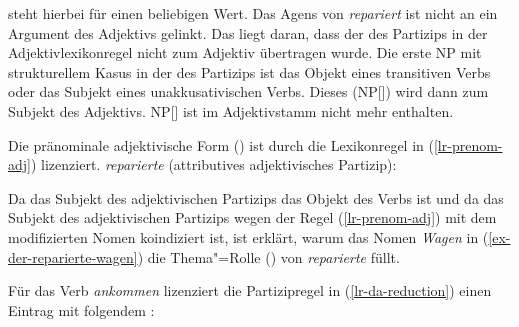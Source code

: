 {\noindent
\etag steht hierbei für einen beliebigen Wert. Das Agens von \emph{repariert} ist nicht an ein
Argument des Adjektivs gelinkt. Das liegt daran, dass der \subjw des Partizips in der
Adjektivlexikonregel nicht zum Adjektiv übertragen wurde. Die erste NP mit strukturellem Kasus in
der \argstl des Partizips ist das Objekt eines transitiven Verbs oder das Subjekt eines
unakkusativischen Verbs. Dieses (NP[\str]) wird dann zum Subjekt des
Adjektivs. NP[\str] ist im Adjektivstamm nicht mehr enthalten.

Die pränominale adjektivische Form () ist durch die Lexikonregel in (\ref{lr-prenom-adj})
lizenziert.
\eas
\emph{reparierte} (attributives adjektivisches Partizip):\\
\zs

\noindent
Da das Subjekt des adjektivischen Partizips das Objekt des Verbs ist und
da das Subjekt des adjektivischen Partizips wegen der Regel (\ref{lr-prenom-adj})
mit dem modifizierten Nomen koindiziert ist, ist erklärt, warum das Nomen \emph{Wagen} 
in (\ref{ex-der-reparierte-wagen}) die Thema"=Rolle (\argtwo) von \emph{reparierte} füllt.

Für das Verb \emph{ankommen} lizenziert die Partizipregel in (\ref{lr-da-reduction}) einen Eintrag
mit folgendem \localw:

}
